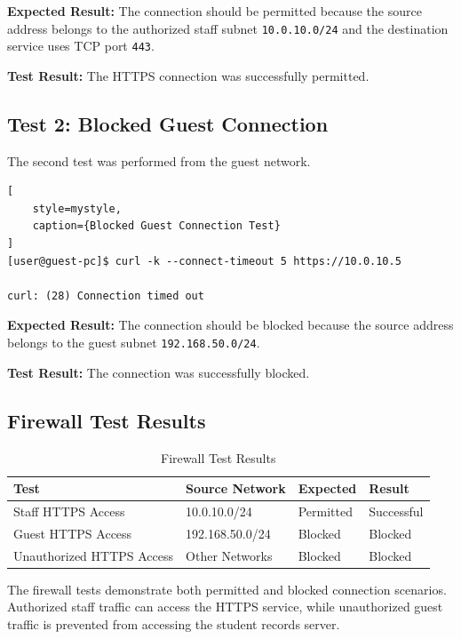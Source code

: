\documentclass[12pt,a4paper]{article}
\begin{document}
\textbf{Expected Result:} The connection should be permitted because the source address belongs to the authorized staff subnet \texttt{10.0.10.0/24} and the destination service uses TCP port \texttt{443}.

\textbf{Test Result:} The HTTPS connection was successfully permitted.

\subsection{Test 2: Blocked Guest Connection}

The second test was performed from the guest network.

\begin{lstlisting}[
    style=mystyle,
    caption={Blocked Guest Connection Test}
]
[user@guest-pc]$ curl -k --connect-timeout 5 https://10.0.10.5

curl: (28) Connection timed out
\end{lstlisting}

\textbf{Expected Result:} The connection should be blocked because the source address belongs to the guest subnet \texttt{192.168.50.0/24}.

\textbf{Test Result:} The connection was successfully blocked.

\subsection{Firewall Test Results}

\begin{table}[htbp]
\centering
\caption{Firewall Test Results}
\begin{tabular}{p{3.5cm} p{3cm} p{3cm} p{3cm}}
\toprule
\textbf{Test} & \textbf{Source Network} & \textbf{Expected} & \textbf{Result} \\
\midrule

Staff HTTPS Access &
10.0.10.0/24 &
Permitted &
Successful \\

Guest HTTPS Access &
192.168.50.0/24 &
Blocked &
Blocked \\

Unauthorized HTTPS Access &
Other Networks &
Blocked &
Blocked \\

\bottomrule
\end{tabular}
\end{table}

The firewall tests demonstrate both permitted and blocked connection scenarios. Authorized staff traffic can access the HTTPS service, while unauthorized guest traffic is prevented from accessing the student records server.
\end{document}
